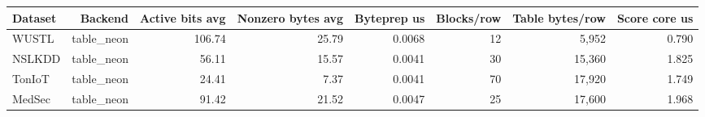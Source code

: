 \begin{tabular}{lrrrrrrr}
\toprule
Dataset & Backend & Active bits avg & Nonzero bytes avg & Byteprep us & Blocks/row & Table bytes/row & Score core us \\
\midrule
WUSTL & table\_neon & 106.74 & 25.79 & 0.0068 & 12 & 5,952 & 0.790 \\
NSLKDD & table\_neon & 56.11 & 15.57 & 0.0041 & 30 & 15,360 & 1.825 \\
TonIoT & table\_neon & 24.41 & 7.37 & 0.0041 & 70 & 17,920 & 1.749 \\
MedSec & table\_neon & 91.42 & 21.52 & 0.0047 & 25 & 17,600 & 1.968 \\
\bottomrule
\end{tabular}
